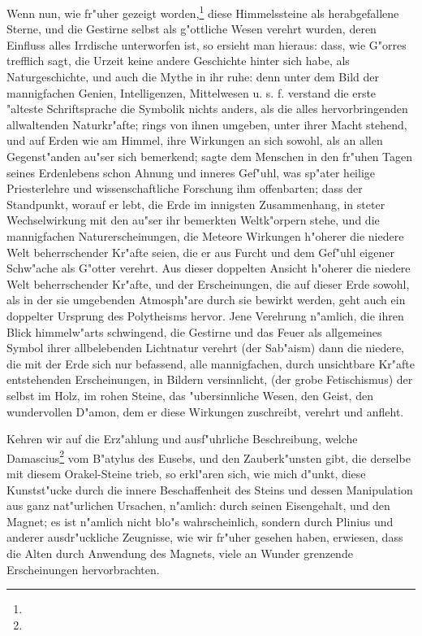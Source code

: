 \documentclass[a4paper, 11pt, oneside, polutonikogreek, german]{article}
\begin{document}
Wenn nun, wie fr"uher gezeigt worden,\footnote{} diese Himmelssteine als herabgefallene Sterne, und die Gestirne selbst als g"ottliche Wesen verehrt wurden, deren Einfluss alles Irrdische unterworfen ist, so ersieht man hieraus: dass, wie G"orres trefflich sagt, die Urzeit keine andere Geschichte hinter sich habe, als Naturgeschichte, und auch die Mythe in ihr ruhe: denn unter dem Bild der mannigfachen Genien, Intelligenzen, Mittelwesen u. s. f. verstand die erste "alteste Schriftsprache die Symbolik nichts anders, als die alles hervorbringenden allwaltenden Naturkr"afte; rings von ihnen umgeben, unter ihrer Macht stehend, und auf Erden wie am Himmel, ihre Wirkungen an sich sowohl, als an allen Gegenst"anden au"ser sich bemerkend; sagte dem Menschen in den fr"uhen Tagen seines Erdenlebens schon Ahnung und inneres Gef"uhl, was sp"ater heilige Priesterlehre und wissenschaftliche Forschung ihm offenbarten; dass der Standpunkt, worauf er lebt, die Erde im innigsten Zusammenhang, in steter Wechselwirkung mit den au"ser ihr bemerkten Weltk"orpern stehe, und die mannigfachen Naturerscheinungen, die Meteore Wirkungen h"oherer die niedere Welt beherrschender Kr"afte seien, die er aus Furcht und dem Gef"uhl eigener Schw"ache als G"otter verehrt. Aus dieser doppelten Ansicht h"oherer die niedere Welt beherrschender Kr"afte, und der Erscheinungen, die auf dieser Erde sowohl, als in der sie umgebenden Atmosph"are durch sie bewirkt werden, geht auch ein doppelter Ursprung des Polytheisms hervor. Jene Verehrung n"amlich, die ihren Blick himmelw"arts schwingend, die Gestirne und das Feuer als allgemeines Symbol ihrer allbelebenden Lichtnatur verehrt (der Sab"aism) dann die niedere, die mit der Erde sich nur befassend, alle mannigfachen, durch unsichtbare Kr"afte entstehenden Erscheinungen, in Bildern versinnlicht, (der grobe Fetischismus) der selbst im Holz, im rohen Steine, das "ubersinnliche Wesen, den Geist, den wundervollen D"amon, dem er diese Wirkungen zuschreibt, verehrt und anfleht.

Kehren wir auf die Erz"ahlung und ausf"uhrliche Beschreibung, welche Damascius\footnote{} vom B"atylus des Eusebs, und den Zauberk"unsten gibt, die derselbe mit diesem Orakel-Steine trieb, so erkl"aren sich, wie mich d"unkt, diese Kunstst"ucke durch die innere Beschaffenheit des Steins und dessen Manipulation aus ganz nat"urlichen Ursachen, n"amlich: durch seinen Eisengehalt, und den Magnet; es ist n"amlich nicht blo"s wahrscheinlich, sondern durch Plinius und anderer ausdr"uckliche Zeugnisse, wie wir fr"uher gesehen haben, erwiesen, dass die Alten durch Anwendung des Magnets, viele an Wunder grenzende Erscheinungen hervorbrachten.
\end{document}
